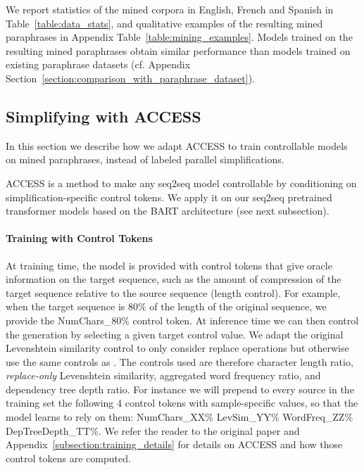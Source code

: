 \documentclass[11pt]{article}
\newcommand{\bart}{\textsc{BART}\xspace}
\newcommand{\access}{\mbox{\textsc{ACCESS}}\xspace}
\begin{document}
We report statistics of the mined corpora in English, French and Spanish in Table~\ref{table:data_stats}, and qualitative examples of the resulting mined paraphrases in Appendix Table~\ref{table:mining_examples}.
Models trained on the resulting mined paraphrases obtain similar performance than models trained on existing paraphrase datasets (cf. Appendix Section~\ref{section:comparison_with_paraphrase_dataset}).



\subsection{Simplifying with \access} \label{subsection:access}
In this section we describe how we adapt \access \cite{martin2020controllable} to train controllable models on mined paraphrases, instead of labeled parallel simplifications.

\access is a method to make any seq2seq model controllable by conditioning on simplification-specific control tokens.
We apply it on our seq2seq pretrained transformer models based on the \bart \cite{lewis2019bart} architecture (see next subsection).

\paragraph{Training with Control Tokens} At training time, the model is provided with control tokens that give oracle information on the target sequence, such as the amount of compression of the target sequence relative to the source sequence (length control). For example, when the target sequence is 80\% of the length of the original sequence, we provide the NumChars\_80\% control token. At inference time we can then control the generation by selecting a given target control value.
We adapt the original Levenshtein similarity control to only consider replace operations but otherwise use the same controls as \citet{martin2020controllable}.
The controls used are therefore character length ratio, \textit{replace-only} Levenshtein similarity, aggregated word frequency ratio, and dependency tree depth ratio.
For instance we will prepend to every source in the training set the following 4 control tokens with sample-specific values, so that the model learns to rely on them: NumChars\_XX\%
LevSim\_YY\% WordFreq\_ZZ\% DepTreeDepth\_TT\%.
We refer the reader to the original paper \cite{martin2020controllable} and Appendix~\ref{subsection:training_details} for details on \access and how those control tokens are computed.
\end{document}
